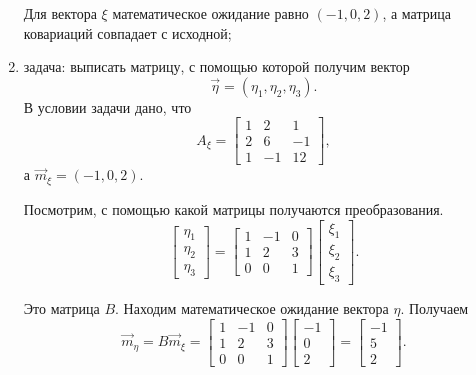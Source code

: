 \begin{enumerate}[label=\alph*)]
  Для вектора $ \xi $ математическое ожидание равно $ \left( -1, 0, 2 \right) $,
  а матрица ковариаций совпадает с исходной;
  \item задача: выписать матрицу,
  с помощью которой получим вектор
  $$ \vec{ \eta } =
    \left( \eta_1, \eta_2, \eta_3 \right).$$
  В условии задачи дано, что
  $$A_{ \xi } =
    \begin{bmatrix}
      1 & 2 & 1 \\
      2 & 6 & -1 \\
      1 & -1 & 12
    \end{bmatrix},$$
  а $ \vec{m}_{ \xi } = \left( -1, 0, 2 \right) $.

  Посмотрим, с помощью какой матрицы получаются преобразования.
  $$ \begin{bmatrix}
      \eta_1 \\
      \eta_2 \\
      \eta_3
    \end{bmatrix} =
    \begin{bmatrix}
      1 & -1 & 0 \\
      1 & 2 & 3 \\
      0 & 0 & 1
    \end{bmatrix}
    \begin{bmatrix}
      \xi_1 \\
      \xi_2 \\
      \xi_3
    \end{bmatrix}.$$

  Это матрица $B$.
  Находим математическое ожидание вектора $ \eta $.
  Получаем
  $$ \vec{m}_{ \eta } =
    B \vec{m}_{ \xi } =
    \begin{bmatrix}
      1 & -1 & 0 \\
      1 & 2 & 3 \\
      0 & 0 & 1
    \end{bmatrix}
    \begin{bmatrix}
      -1 \\
      0 \\
      2
    \end{bmatrix} =
    \begin{bmatrix}
      -1 \\
      5 \\
      2
    \end{bmatrix}.$$


\end{enumerate}
